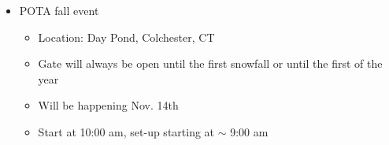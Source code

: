 \documentclass[12pt, letterpaper]{article}
\begin{document}
\begin{enumerate}
\begin{itemize}
                \item POTA fall event
                    \begin{itemize}
                        \item Location: Day Pond, Colchester, CT
                        \item Gate will always be open until the first snowfall or until the first of the year
                        \item Will be happening Nov. 14th
                        \item Start at 10:00 am, set-up starting at $\sim$ 9:00 am
                    \end{itemize}
            \end{itemize}
    \end{enumerate}
\end{document}
